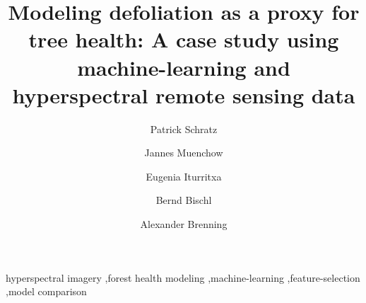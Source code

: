 \documentclass[review]{elsarticle}
\begin{document}
\begin{frontmatter}

	\title{Modeling defoliation as a proxy for tree health: A case study using machine-learning and hyperspectral remote sensing data}

	\author[FSU]{Patrick Schratz}

	\author[FSU]{Jannes Muenchow}
	\author[NEIKER]{Eugenia Iturritxa}
	\author[LMU]{Bernd Bischl}
	\author[FSU]{Alexander Brenning}

	\address[FSU]{Department of Geography, GIScience group, Grietgasse 6, 07743, Jena, Germany}
	\address[NEIKER]{NEIKER, Granja Modelo –Arkaute, Apdo. 46, 01080 Vitoria-Gasteiz, Arab, Spain}
	\address[LMU]{Department of Statistics, Chair for computational Statistics, Ludwig-Maximilian University Munich, Germany}

	\begin{abstract}

	\end{abstract}

	\begin{keyword}
		hyperspectral imagery \sep forest health modeling \sep machine-learning \sep feature-selection  \sep model comparison
	\end{keyword}

\end{frontmatter}

\linenumbers
\end{document}
